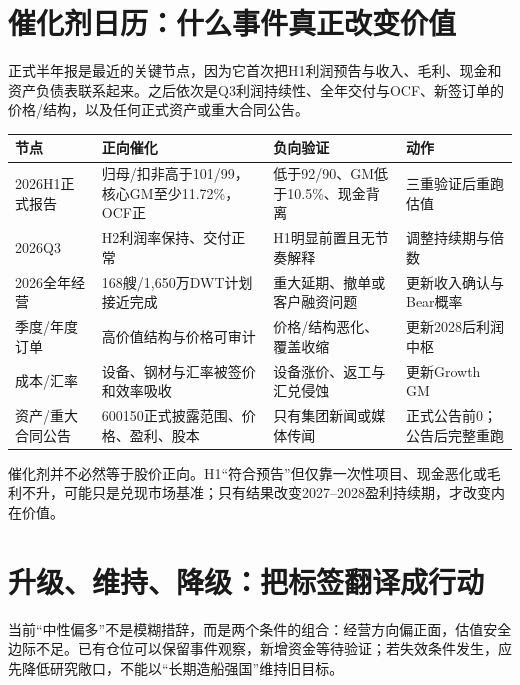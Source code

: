 \section{催化剂日历：什么事件真正改变价值}

正式半年报是最近的关键节点，因为它首次把H1利润预告与收入、毛利、现金和资产负债表联系起来。之后依次是Q3利润持续性、全年交付与OCF、新签订单的价格/结构，以及任何正式资产或重大合同公告。

\begin{exhibitbox}[催化剂与证据要求]
\small
\begin{tabularx}{\exhibitboxwidth}{L{2.8cm}L{4.2cm}L{4.0cm}X}
\toprule
\textbf{节点} & \textbf{正向催化} & \textbf{负向验证} & \textbf{动作} \\
\midrule
2026H1正式报告 & 归母/扣非高于101/99，核心GM至少11.72\%，OCF正 & 低于92/90、GM低于10.5\%、现金背离 & 三重验证后重跑估值 \\
2026Q3 & H2利润率保持、交付正常 & H1明显前置且无节奏解释 & 调整持续期与倍数 \\
2026全年经营 & 168艘/1,650万DWT计划接近完成 & 重大延期、撤单或客户融资问题 & 更新收入确认与Bear概率 \\
季度/年度订单 & 高价值结构与价格可审计 & 价格/结构恶化、覆盖收缩 & 更新2028后利润中枢 \\
成本/汇率 & 设备、钢材与汇率被签价和效率吸收 & 设备涨价、返工与汇兑侵蚀 & 更新Growth GM \\
资产/重大合同公告 & 600150正式披露范围、价格、盈利、股本 & 只有集团新闻或媒体传闻 & 正式公告前0；公告后完整重跑 \\
\bottomrule
\end{tabularx}
\end{exhibitbox}

催化剂并不必然等于股价正向。H1“符合预告”但仅靠一次性项目、现金恶化或毛利不升，可能只是兑现市场基准；只有结果改变2027--2028盈利持续期，才改变内在价值。

\section{升级、维持、降级：把标签翻译成行动}

当前“中性偏多”不是模糊措辞，而是两个条件的组合：经营方向偏正面，估值安全边际不足。已有仓位可以保留事件观察，新增资金等待验证；若失效条件发生，应先降低研究敞口，不能以“长期造船强国”维持旧目标。

